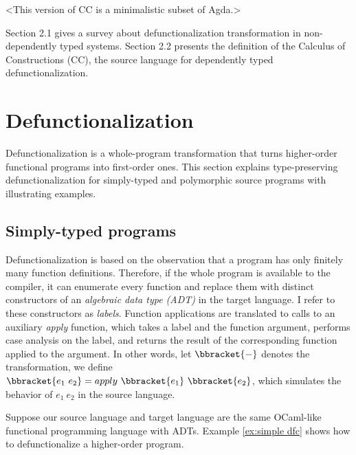 
<This version of CC is a minimalistic subset of Agda.>

Section 2.1 gives a survey about defunctionalization transformation in non-dependently typed systems. Section 2.2 presents the definition of the Calculus of Constructions (CC), the source language for dependently typed defunctionalization.

\section{Defunctionalization}

Defunctionalization is a whole-program transformation that turns higher-order functional programs into first-order ones. This section explains type-preserving defunctionalization for simply-typed and polymorphic source programs with illustrating examples.

\subsection{Simply-typed programs}

Defunctionalization is based on the observation that a program has only finitely many function definitions. Therefore, if the whole program is available to the compiler, it can enumerate every function and replace them with distinct constructors of an \textit{algebraic data type (ADT)} in the target language. I refer to these constructors as \textit{labels}. Function applications are translated to calls to an auxiliary \textit{apply} function, which takes a label and the function argument, performs case analysis on the label, and returns the result of the corresponding function applied to the argument. In other words, let $\bbracket{-}$ denotes the transformation, we define $ \bbracket{e_1\ e_2} = apply\ \bbracket{e_1}\ \bbracket{e_2} $, which simulates the behavior of $e_1\ e_2$ in the source language.

Suppose our source language and target language are the same OCaml-like functional programming language with ADTs. Example \ref{ex:simple dfc} shows how to defunctionalize a higher-order program.

